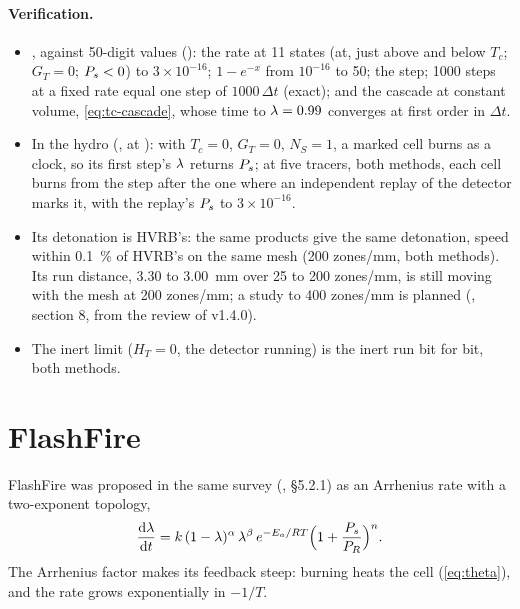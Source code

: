 \paragraph{Verification.}
\begin{itemize}
\item {}, against 50-digit values ():
  the rate at 11 states (at, just above and below $T_c$; $G_T = 0$; $P_{s} <
  0$) to $3\times 10^{-16}$; $1 - e^{-x}$ from $10^{-16}$ to 50; the step;
  1000 steps at a fixed rate equal one step of $1000\,\Delta t$ (exact); and the cascade at constant volume,
  \cref{eq:tc-cascade}, whose time to $\lambda = 0.99$ converges at first order
  in $\Delta t$.
\item In the hydro (, at
  ): with $T_c = 0$, $G_T = 0$, $N_S = 1$, a marked cell burns
  as a clock, so its first step's $\lambda$ returns $P_{s}$; at five tracers, both
  methods, each cell burns from the step after the one where an independent
  replay of the detector marks it, with the replay's $P_{s}$ to $3\times
  10^{-16}$.
\item Its detonation is HVRB's: the same products give the same detonation,
  speed within 0.1~\% of HVRB's on the same mesh (200 zones/mm, both
  methods). Its run distance, 3.30 to 3.00~mm over 25 to 200 zones/mm,
  is still moving with the mesh at 200 zones/mm; a study to 400 zones/mm is
  planned (, section 8, from the review of v1.4.0).
\item The inert limit ($H_T = 0$, the detector running) is the inert run bit
  for bit, both methods.
\end{itemize}

\section{FlashFire}
\label{sec:flashfire}

FlashFire was proposed in the same survey (\cite{kittell2025sand}, \S 5.2.1)
as an Arrhenius rate with a two-exponent topology,
\begin{equation*}
  \frac{\mathrm{d}\lambda}{\mathrm{d} t} = k\,(1 - \lambda)^{\alpha}\,\lambda^{\beta}\,
  e^{-E_a/RT}\Bigl(1 + \frac{P_{s}}{P_R}\Bigr)^{n}.
\end{equation*}
The Arrhenius factor makes its feedback steep: burning heats the cell
(\cref{eq:theta}), and the rate grows exponentially in $-1/T$.

